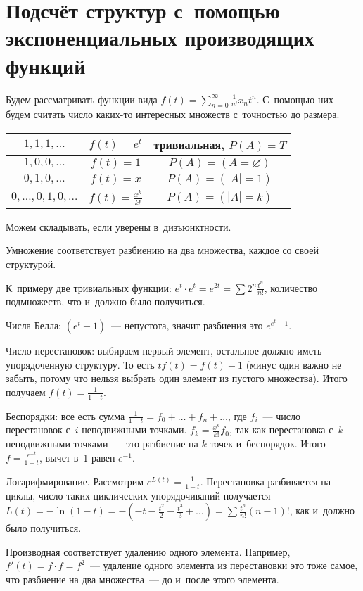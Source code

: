 \documentclass{article}
\begin{document}
\section{Подсчёт структур с~помощью экспоненциальных производящих функций}

Будем рассматривать функции вида $f(t) = \sum\limits_{n=0}^{\infty}
\frac{1}{n!} x_n t^n$. С~помощью них будем считать число каких-то интересных
множеств с~точностью до размера.

\begin{center}
	\begin{tabular}{|c|c|c|}
		\hline
		$1, 1, 1, \ldots$ & $f(t) = e^t$ & тривиальная, $P(A) = T$\\
		\hline
		$1, 0, 0, \ldots$ & $f(t) = 1$ & $P(A) = (A = \varnothing)$\\
		\hline
		$0, 1, 0, \ldots$ & $f(t) = x$ & $P(A) = (|A| = 1)$ \\
		\hline
		$0, \ldots, 0, 1, 0, \ldots$ & $f(t) = \frac{x^k}{k!}$ & $P(A)=(|A| = k)$\\
		\hline
	\end{tabular}
\end{center}

Можем складывать, если уверены в~дизъюнктности.

Умножение соответствует разбиению на два множества, каждое со своей структурой.

К~примеру две тривиальных функции: $e^t \cdot e^t = e^{2t} = \sum 2^n
\frac{t^n}{n!}$, количество подмножеств, что и~должно было получиться.

Числа Белла: $(e^t - 1)$~--- непустота, значит разбиения это $e^{e^t - 1}$.

Число перестановок: выбираем первый элемент, остальное должно иметь
упорядоченную структуру. То есть $t f(t) = f(t) - 1$ (минус один важно не
забыть, потому что нельзя выбрать один элемент из пустого множества). Итого
получаем $f(t) = \frac{1}{1-t}$.

Беспорядки: все есть сумма $\frac{1}{1-t} = f_0 + \ldots + f_n + \ldots$, где
$f_i$~--- число перестановок с~$i$ неподвижными точками. $f_k = \frac{x^k}{k!}
f_0$, так как перестановка с~$k$ неподвижными точками~--- это разбиение на $k$
точек и~беспорядок. Итого $f = \frac{e^{-t}}{1-t}$, вычет в~1 равен $e^{-1}$.

Логарифмирование. Рассмотрим $e^{L(t)} = \frac{1}{1-t}$. Перестановка
разбивается на циклы, число таких циклических упорядочиваний получается $L(t) =
-\ln(1-t) = -(-t-\frac{t^2}{2}-\frac{t^3}{3} + \ldots) = \sum\limits
\frac{t^n}{n!}(n-1)!$, как и~должно было получиться.

Производная соответствует удалению одного элемента. Например, $f'(t) = f \cdot
f = f^2$~--- удаление одного элемента из перестановки это тоже самое, что
разбиение на два множества~--- до и~после этого элемента.
\end{document}
